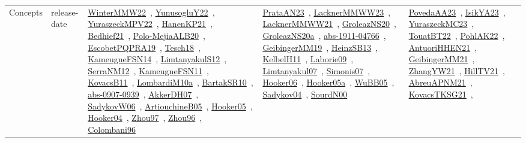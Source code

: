 {\begin{longtable}{lp{3cm}>{\raggedright\arraybackslash}p{6cm}>{\raggedright\arraybackslash}p{6cm}>{\raggedright\arraybackslash}p{8cm}}
Concepts & release-date & \href{works/WinterMMW22.pdf}{WinterMMW22}~\cite{WinterMMW22}, \href{works/YunusogluY22.pdf}{YunusogluY22}~\cite{YunusogluY22}, \href{works/YuraszeckMPV22.pdf}{YuraszeckMPV22}~\cite{YuraszeckMPV22}, \href{works/HanenKP21.pdf}{HanenKP21}~\cite{HanenKP21}, \href{works/Bedhief21.pdf}{Bedhief21}~\cite{Bedhief21}, \href{works/Polo-MejiaALB20.pdf}{Polo-MejiaALB20}~\cite{Polo-MejiaALB20}, \href{works/EscobetPQPRA19.pdf}{EscobetPQPRA19}~\cite{EscobetPQPRA19}, \href{works/Tesch18.pdf}{Tesch18}~\cite{Tesch18}, \href{works/KameugneFSN14.pdf}{KameugneFSN14}~\cite{KameugneFSN14}, \href{works/LimtanyakulS12.pdf}{LimtanyakulS12}~\cite{LimtanyakulS12}, \href{works/SerraNM12.pdf}{SerraNM12}~\cite{SerraNM12}, \href{works/KameugneFSN11.pdf}{KameugneFSN11}~\cite{KameugneFSN11}, \href{works/KovacsB11.pdf}{KovacsB11}~\cite{KovacsB11}, \href{works/LombardiM10a.pdf}{LombardiM10a}~\cite{LombardiM10a}, \href{works/BartakSR10.pdf}{BartakSR10}~\cite{BartakSR10}, \href{works/abs-0907-0939.pdf}{abs-0907-0939}~\cite{abs-0907-0939}, \href{works/AkkerDH07.pdf}{AkkerDH07}~\cite{AkkerDH07}, \href{works/SadykovW06.pdf}{SadykovW06}~\cite{SadykovW06}, \href{works/ArtiouchineB05.pdf}{ArtiouchineB05}~\cite{ArtiouchineB05}, \href{works/Hooker05.pdf}{Hooker05}~\cite{Hooker05}, \href{works/Hooker04.pdf}{Hooker04}~\cite{Hooker04}, \href{works/Zhou97.pdf}{Zhou97}~\cite{Zhou97}, \href{works/Zhou96.pdf}{Zhou96}~\cite{Zhou96}, \href{works/Colombani96.pdf}{Colombani96}~\cite{Colombani96} & \href{works/PrataAN23.pdf}{PrataAN23}~\cite{PrataAN23}, \href{works/LacknerMMWW23.pdf}{LacknerMMWW23}~\cite{LacknerMMWW23}, \href{works/LacknerMMWW21.pdf}{LacknerMMWW21}~\cite{LacknerMMWW21}, \href{works/GroleazNS20.pdf}{GroleazNS20}~\cite{GroleazNS20}, \href{works/GroleazNS20a.pdf}{GroleazNS20a}~\cite{GroleazNS20a}, \href{works/abs-1911-04766.pdf}{abs-1911-04766}~\cite{abs-1911-04766}, \href{works/GeibingerMM19.pdf}{GeibingerMM19}~\cite{GeibingerMM19}, \href{works/HeinzSB13.pdf}{HeinzSB13}~\cite{HeinzSB13}, \href{works/KelbelH11.pdf}{KelbelH11}~\cite{KelbelH11}, \href{works/Laborie09.pdf}{Laborie09}~\cite{Laborie09}, \href{works/Limtanyakul07.pdf}{Limtanyakul07}~\cite{Limtanyakul07}, \href{works/Simonis07.pdf}{Simonis07}~\cite{Simonis07}, \href{works/Hooker06.pdf}{Hooker06}~\cite{Hooker06}, \href{works/Hooker05a.pdf}{Hooker05a}~\cite{Hooker05a}, \href{works/WuBB05.pdf}{WuBB05}~\cite{WuBB05}, \href{works/Sadykov04.pdf}{Sadykov04}~\cite{Sadykov04}, \href{works/SourdN00.pdf}{SourdN00}~\cite{SourdN00} & \href{works/PovedaAA23.pdf}{PovedaAA23}~\cite{PovedaAA23}, \href{works/IsikYA23.pdf}{IsikYA23}~\cite{IsikYA23}, \href{works/YuraszeckMC23.pdf}{YuraszeckMC23}~\cite{YuraszeckMC23}, \href{works/TouatBT22.pdf}{TouatBT22}~\cite{TouatBT22}, \href{works/PohlAK22.pdf}{PohlAK22}~\cite{PohlAK22}, \href{works/AntuoriHHEN21.pdf}{AntuoriHHEN21}~\cite{AntuoriHHEN21}, \href{works/GeibingerMM21.pdf}{GeibingerMM21}~\cite{GeibingerMM21}, \href{works/ZhangYW21.pdf}{ZhangYW21}~\cite{ZhangYW21}, \href{works/HillTV21.pdf}{HillTV21}~\cite{HillTV21}, \href{works/AbreuAPNM21.pdf}{AbreuAPNM21}~\cite{AbreuAPNM21}, \href{works/KovacsTKSG21.pdf}{KovacsTKSG21}~\cite{KovacsTKSG21}, 
\end{longtable}}

